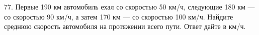 77. Первые 190 км автомобиль ехал со скоростью 50 км/ч, следующие 180 км --- со скоростью 90 км/ч, а затем 170 км --- со скоростью 100 км/ч. Найдите среднюю скорость автомобиля на протяжении всего пути. Ответ дайте в км/ч.\\
